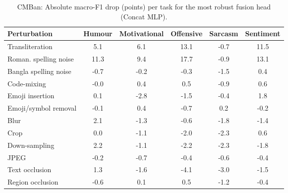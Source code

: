 \begin{table}[t]
\centering
\small
\caption{CMBan: Absolute macro-F1 drop (points) per task for the most robust fusion head (Concat MLP).}
\label{tab:rob_task_coarse_cmban}
\begin{adjustbox}{max width=\columnwidth}
\begin{tabular}{lccccc}
\toprule
Perturbation & Humour & Motivational & Offensive & Sarcasm & Sentiment \\
\midrule
Transliteration & 5.1 & 6.1 & 13.1 & -0.7 & 11.5 \\
Roman. spelling noise & 11.3 & 9.4 & 17.7 & -0.9 & 13.1 \\
Bangla spelling noise & -0.7 & -0.2 & -0.3 & -1.5 & 0.4 \\
Code-mixing & -0.0 & 0.4 & 0.5 & -0.9 & 0.6 \\
Emoji insertion & 0.1 & -2.8 & -1.5 & -0.4 & 1.8 \\
Emoji/symbol removal & -0.1 & 0.4 & -0.7 & 0.2 & -0.2 \\
Blur & 2.1 & -1.3 & -0.6 & -1.8 & -1.4 \\
Crop & 0.0 & -1.1 & -2.0 & -2.3 & 0.6 \\
Down-sampling & 2.2 & -1.1 & -2.2 & -2.3 & -1.8 \\
JPEG & -0.2 & -0.7 & -0.4 & -0.6 & -0.4 \\
Text occlusion & 1.3 & -1.6 & -4.1 & -3.0 & -1.5 \\
Region occlusion & -0.6 & 0.1 & 0.5 & -1.2 & -0.4 \\
\bottomrule
\end{tabular}
\end{adjustbox}
\end{table}
